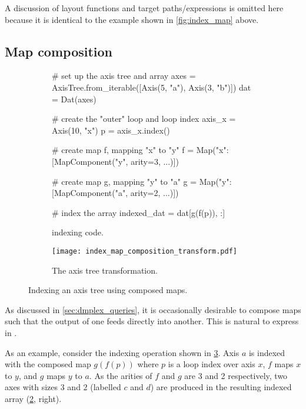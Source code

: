 \documentclass[thesis]{subfiles}
\begin{document}
A discussion of layout functions and target paths/expressions is omitted here because it is identical to the example shown in \cref{fig:index_map} above.

\subsection{Map composition}
\label{sec:indexing_map_composition}

\begin{figure}
  \centering

  \begin{subfigure}{.9\textwidth}
    \begin{pyalg2}
      # set up the axis tree and array
      axes = AxisTree.from_iterable([Axis(5, "a"), Axis(3, "b")])
      dat = Dat(axes)

      # create the "outer" loop and loop index
      axis_x = Axis(10, "x")
      p = axis_x.index()

      # create map f, mapping "x" to "y"
      f = Map({"x": [MapComponent("y", arity=3, ...)]})

      # create map g, mapping "y" to "a"
      g = Map({"y": [MapComponent("a", arity=2, ...)]})

      # index the array
      indexed_dat = dat[g(f(p)), :]
    \end{pyalg2}

    \caption{ indexing code.}
    \label{fig:index_map_composition_code}
  \end{subfigure}

  \vspace{1em}

  \begin{subfigure}{\textwidth}
    \centering
    \texttt{[image: index\_map\_composition\_transform.pdf]}
    \caption{
      The axis tree transformation.
    }
    \label{fig:index_map_composition_transform}
  \end{subfigure}
  \caption{Indexing an axis tree using composed maps.}
  \label{fig:index_map_composition}
\end{figure}

As discussed in \cref{sec:dmplex_queries}, it is occasionally desirable to compose maps such that the output of one feeds directly into another.
This is natural to express in .

As an example, consider the indexing operation shown in \cref{fig:index_map_composition}.
Axis $a$ is indexed with the composed map $g(f(p))$ where $p$ is a loop index over axis $x$, $f$ maps $x$ to $y$, and $g$ maps $y$ to $a$.
As the arities of $f$ and $g$ are 3 and 2 respectively, two axes with sizes 3 and 2 (labelled $c$ and $d$) are produced in the resulting indexed array (\ref{fig:index_map_composition_transform}, right).
\end{document}

